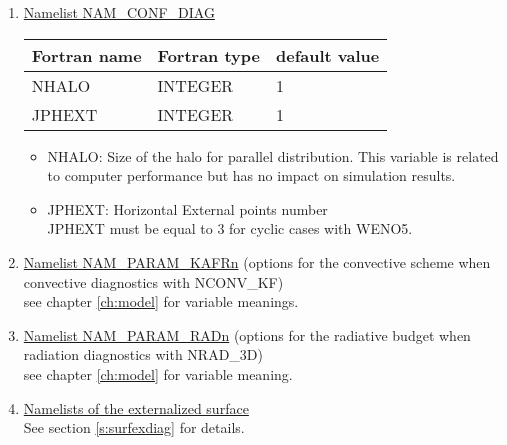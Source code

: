 \begin{enumerate}
\item\underline{Namelist NAM\_CONF\_DIAG}
\begin{center}
\begin{tabular} {|l|l|l|}
\hline
Fortran name & Fortran type & default value\\
\hline
\hline
NHALO  & INTEGER & 1 \\
JPHEXT & INTEGER & 1 \\
\hline
\end{tabular}
\end{center}

\begin{itemize}
\item
NHALO: Size of the halo for parallel distribution.
This variable is related to computer performance but has no
impact on simulation results.\\

\item
JPHEXT:  Horizontal External points number\\
JPHEXT must be equal to 3 for cyclic cases with WENO5.
\end{itemize}

\item\underline{Namelist NAM\_PARAM\_KAFRn} (options for the convective scheme when convective diagnostics with NCONV\_KF) \\
see chapter \ref{ch:model} for variable meanings.

\item\underline{Namelist NAM\_PARAM\_RADn} (options for the radiative budget when radiation diagnostics with NRAD\_3D) \\
see chapter \ref{ch:model} for variable meaning.

\item\underline{Namelists of the externalized surface} \\
See section \ref{s:surfexdiag} for details.

\end{enumerate}



